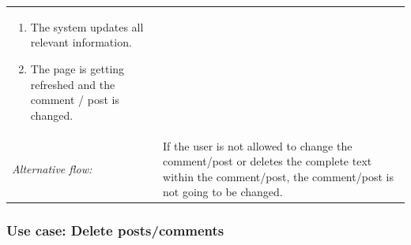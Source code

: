 \documentclass[11pt,a4paper]{report}
\begin{document}
\begin{longtable}{p{} | p{}}
\begin{enumerate}
                \item The system updates all relevant information.
                \item The page is getting refreshed and the comment / post is changed.
             \end{enumerate} \\
        \emph{Alternative flow:} & If the user is not allowed to change the comment/post or deletes the complete text within the comment/post, the comment/post is not going to be changed.\\ 
             \hline
\end{longtable}

\subsubsection{Use case: Delete posts/comments}
\end{document}
